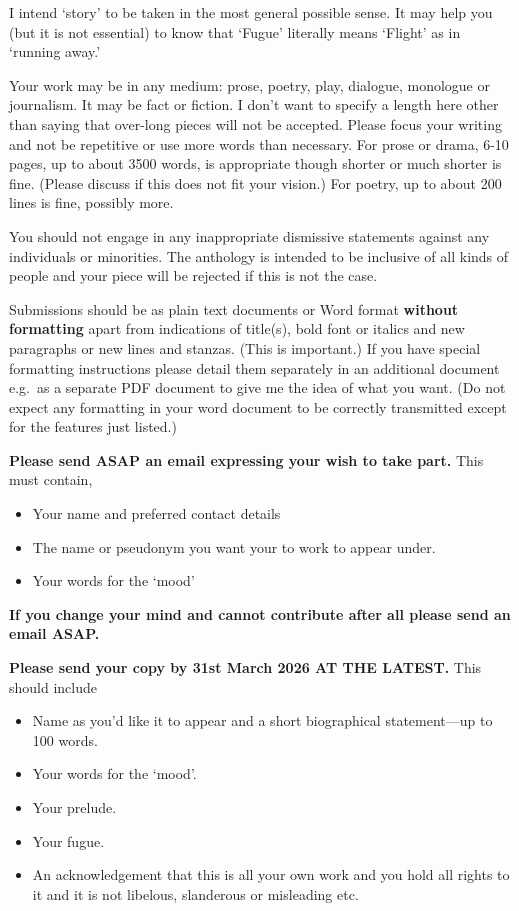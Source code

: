 \documentclass[a4paper]{article}
\begin{document}
I intend `story' to be taken in the most general possible sense.  It
may help you (but it is not essential) to know that `Fugue' literally
means `Flight' as in `running away.'

Your work may be in any medium: prose, poetry, play, dialogue,
monologue or journalism.  It may be fact or fiction.  I don't want to
specify a length here other than saying that over-long pieces will not
be accepted.  Please focus your writing and not be repetitive or use
more words than necessary.  For prose or drama, 6-10 pages, up to about 3500
words, is appropriate though shorter or much shorter is fine.  (Please
discuss if this does not fit your vision.) For poetry, up to about 200
lines is fine, possibly more.

You should not engage in any inappropriate dismissive statements
against any individuals or minorities.  The anthology is intended to
be inclusive of all kinds of people and your piece will be rejected
if this is not the case.

Submissions should be as plain text documents or Word format
\textbf{without formatting} apart from indications of title(s), bold
font or italics and new paragraphs or new lines and stanzas. (This is
important.) If you have special formatting instructions please detail
them separately in an additional document e.g.~as a separate PDF
document to give me the idea of what you want.  (Do not expect any
formatting in your word document to be correctly transmitted except
for the features just listed.)

\textbf{Please send ASAP an email expressing your wish to take part.}
This must contain,
\begin{itemize}
\item Your name and preferred contact details
\item The name or pseudonym you want your to work to appear under.
\item Your words for the `mood'
\end{itemize}

\textbf{If you change your mind and cannot contribute after all please
  send an email ASAP.}

\textbf{Please send your copy by 31st March 2026 AT THE LATEST.} This should include
\begin{itemize}
\item Name as you'd like it to appear and a short biographical
  statement---up to 100 words.
\item Your words for the `mood'.
\item Your prelude.
\item Your fugue.
\item An acknowledgement that this is all your own work and you hold
  all rights to it and it is not libelous, slanderous or misleading
  etc.
\end{itemize}
\end{document}
